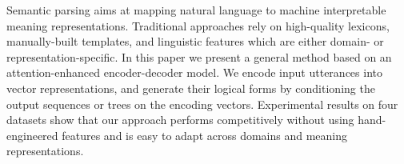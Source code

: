 Semantic parsing aims at mapping natural language to machine interpretable meaning representations. Traditional approaches rely on high-quality lexicons, manually-built templates, and linguistic features which are either domain- or representation-specific. In this paper we present a general method based on an attention-enhanced encoder-decoder model. We encode input utterances into vector representations, and generate their logical forms by conditioning the output sequences or trees on the encoding vectors. Experimental results on four datasets show that our approach performs competitively without using hand-engineered features and is easy to adapt across domains and meaning representations.
